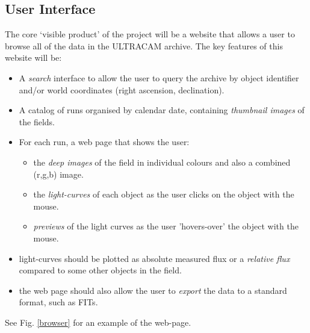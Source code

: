 \subsection{User Interface}
The core `visible product' of the project will be a website that allows a user to browse all of the data in the ULTRACAM archive. The key features of this website will be:

\begin{itemize}
	\item A \emph{search} interface to allow the user to query the archive by object identifier and/or world coordinates (right ascension, declination). 
	\item A catalog of runs organised by calendar date, containing \emph{thumbnail images} of the fields.
	\item For each run, a web page that shows the user:
	\begin{itemize}
		\item the \emph{deep images} of the field in individual colours and also a combined (r,g,b) image.
		\item the \emph{light-curves} of each object as the user clicks on the object with the mouse. 
		\item \emph{previews} of the light curves as the user 'hovers-over' the object with the mouse. 
	\end{itemize}
	\item light-curves should be plotted as absolute measured flux or a \emph{relative flux} compared to some other objects in the field. 
	\item the web page should also allow the user to \emph{export} the data to a standard format, such as FITs.
	
\end{itemize}
See Fig. \ref{browser} for an example of the web-page. 


